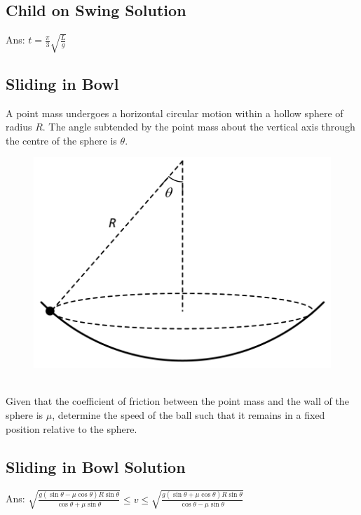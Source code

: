 \documentclass{article}
\begin{document}
\subsection{Child on Swing Solution}
Ans: $t=\frac{\pi}{3} \sqrt{\frac{L}{g}}$
\clearpage
\subsection{Sliding in Bowl }
A point mass undergoes a horizontal circular motion within a hollow sphere of radius $R$. The angle subtended by the point mass about the vertical axis through the centre of the sphere is $\theta$.
\begin{figure}[h]
    \centering
\includegraphics[width=0.6\linewidth]{images/slidinginbowl.png}
\end{figure}\\
Given that the coefficient of friction between the point mass and the wall of the sphere is $\mu$, determine the speed of the ball such that it remains in a fixed position relative to the sphere.

\clearpage
\subsection{Sliding in Bowl Solution}
Ans: $\sqrt{\frac{g(\sin \theta-\mu \cos \theta) R \sin \theta}{\cos \theta+\mu \sin \theta}} \leq v \leq \sqrt{\frac{g(\sin \theta+\mu \cos \theta) R \sin \theta}{\cos \theta-\mu \sin \theta}}$
\clearpage
\end{document}
